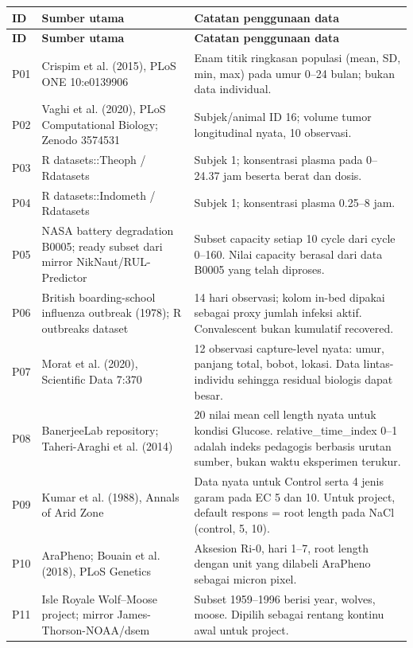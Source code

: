 \documentclass[11pt,a4paper]{article}
\begin{document}
\begin{longtable}{L{0.7cm} L{5.0cm} L{8.2cm}}
\toprule
\textbf{ID} & \textbf{Sumber utama} & \textbf{Catatan penggunaan data} \\
\midrule
\endfirsthead
\toprule
\textbf{ID} & \textbf{Sumber utama} & \textbf{Catatan penggunaan data} \\
\midrule
\endhead
P01 & Crispim et al. (2015), PLoS ONE 10:e0139906 & Enam titik ringkasan populasi (mean, SD, min, max) pada umur 0–24 bulan; bukan data individual. \\
P02 & Vaghi et al. (2020), PLoS Computational Biology; Zenodo 3574531 & Subjek/animal ID 16; volume tumor longitudinal nyata, 10 observasi. \\
P03 & R datasets::Theoph / Rdatasets & Subjek 1; konsentrasi plasma pada 0–24.37 jam beserta berat dan dosis. \\
P04 & R datasets::Indometh / Rdatasets & Subjek 1; konsentrasi plasma 0.25–8 jam. \\
P05 & NASA battery degradation B0005; ready subset dari mirror NikNaut/RUL-Predictor & Subset capacity setiap 10 cycle dari cycle 0–160. Nilai capacity berasal dari data B0005 yang telah diproses. \\
P06 & British boarding-school influenza outbreak (1978); R outbreaks dataset & 14 hari observasi; kolom in-bed dipakai sebagai proxy jumlah infeksi aktif. Convalescent bukan kumulatif recovered. \\
P07 & Morat et al. (2020), Scientific Data 7:370 & 12 observasi capture-level nyata: umur, panjang total, bobot, lokasi. Data lintas-individu sehingga residual biologis dapat besar. \\
P08 & BanerjeeLab repository; Taheri-Araghi et al. (2014) & 20 nilai mean cell length nyata untuk kondisi Glucose. relative\_time\_index 0–1 adalah indeks pedagogis berbasis urutan sumber, bukan waktu eksperimen terukur. \\
P09 & Kumar et al. (1988), Annals of Arid Zone & Data nyata untuk Control serta 4 jenis garam pada EC 5 dan 10. Untuk project, default respons = root length pada NaCl (control, 5, 10). \\
P10 & AraPheno; Bouain et al. (2018), PLoS Genetics & Aksesion Ri-0, hari 1–7, root length dengan unit yang dilabeli AraPheno sebagai micron pixel. \\
P11 & Isle Royale Wolf–Moose project; mirror James-Thorson-NOAA/dsem & Subset 1959–1996 berisi year, wolves, moose. Dipilih sebagai rentang kontinu awal untuk project. \\
\bottomrule
\end{longtable}
\end{document}
